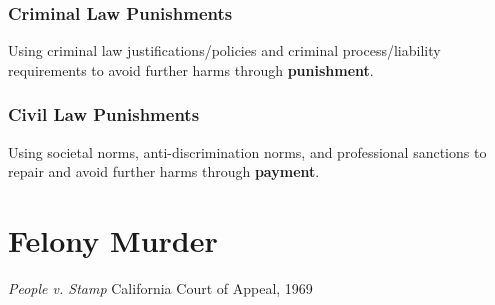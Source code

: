 \documentclass[11pt]{tex/lawoutline}
\begin{document}
\subsubsection{Criminal Law Punishments}
Using criminal law justifications/policies and criminal process/liability requirements to avoid further harms through \textbf{punishment}.

\subsubsection{Civil Law Punishments}
Using societal norms, anti-discrimination norms, and professional sanctions to repair and avoid further harms through \textbf{payment}.

\section{Felony Murder}
\casebox
    {\textit{People v. Stamp}}
    {California Court of Appeal, 1969}
\end{document}
